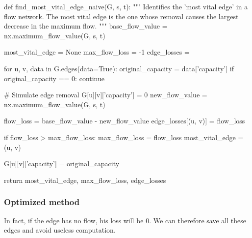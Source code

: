 \documentclass[12pt, openany]{article}
\begin{document}
\begin{python}[caption={Python code for the naive approach in order to identify the most vital edge},  label={lst:2_naive_method_lst}]
def find_most_vital_edge_naive(G, s, t):
    """
    Identifies the 'most vital edge' in a flow network.
    The most vital edge is the one whose removal causes the largest decrease in the maximum flow.
    """
    base_flow_value = nx.maximum_flow_value(G, s, t)
    
    most_vital_edge = None
    max_flow_loss = -1
    edge_losses = {}
    
    for u, v, data in G.edges(data=True):
        original_capacity = data['capacity']
        if original_capacity == 0: continue
            
        # Simulate edge removal
        G[u][v]['capacity'] = 0
        new_flow_value = nx.maximum_flow_value(G, s, t)
        
        flow_loss = base_flow_value - new_flow_value
        edge_losses[(u, v)] = flow_loss
        
        if flow_loss > max_flow_loss:
            max_flow_loss = flow_loss
            most_vital_edge = (u, v)
            
        G[u][v]['capacity'] = original_capacity
        
    return most_vital_edge, max_flow_loss, edge_losses
\end{python}

\subsubsection{Optimized method}\label{sec:2_optimized_method}

In fact, if the edge has no flow, his loss will be $0$. We can therefore save all these edges and avoid useless computation.
\end{document}
